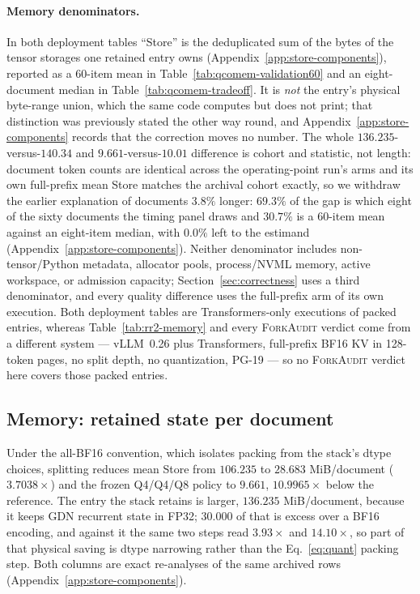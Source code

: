 \documentclass{article}
\newcommand{\method}{\textsc{ForkAudit}}
\begin{document}
\paragraph{Memory denominators.}
\label{sec:denominators}
In both deployment tables ``Store'' is the deduplicated sum of the bytes of
the tensor storages one retained entry owns
(Appendix~\ref{app:store-components}), reported as a 60-item mean in
Table~\ref{tab:qcomem-validation60} and an eight-document median in
Table~\ref{tab:qcomem-tradeoff}.  It is \emph{not} the entry's physical byte-range union, which the same code
computes but does not print; that distinction was previously stated the other
way round, and Appendix~\ref{app:store-components} records that the correction
moves no number.
The whole $136.235$-versus-$140.34$ and $9.661$-versus-$10.01$ difference is
cohort and statistic, not length: document token counts are identical across the
operating-point run's arms and its own full-prefix mean Store matches the
archival cohort exactly, so we withdraw the earlier explanation of documents
$3.8\%$ longer: $69.3\%$ of the gap is which eight of the sixty documents the
timing panel draws and $30.7\%$ is a 60-item mean against an eight-item median,
with $0.0\%$ left to the estimand (Appendix~\ref{app:store-components}).  Neither denominator includes
non-tensor/Python metadata, allocator pools, process/NVML memory, active
workspace, or admission capacity; Section~\ref{sec:correctness} uses a third
denominator, and every quality difference uses the full-prefix arm of its own
execution.
Both deployment tables are Transformers-only executions of packed entries,
whereas Table~\ref{tab:rr2-memory} and every \method{} verdict come from a
different system --- vLLM~0.26 plus Transformers, full-prefix BF16 KV in
128-token pages, no split depth, no quantization, PG-19 --- so no \method{}
verdict here covers those packed entries.

\subsection{Memory: retained state per document}
\label{sec:memory}

Under the all-BF16 convention, which isolates packing from the stack's dtype
choices, splitting reduces mean Store from $106.235$ to $28.683$ MiB/document
($3.7038\times$) and the frozen Q4/Q4/Q8 policy to $9.661$, $10.9965\times$
below the reference.  The entry the
stack retains is larger, $136.235$ MiB/document, because it keeps GDN recurrent
state in FP32; $30.000$ of that is excess over a BF16 encoding, and against it
the same two steps read $3.93\times$ and $14.10\times$, so part of that physical
saving is dtype narrowing rather than the Eq.~\ref{eq:quant} packing step.  Both
columns are exact re-analyses of the same archived rows
(Appendix~\ref{app:store-components}).
\end{document}
